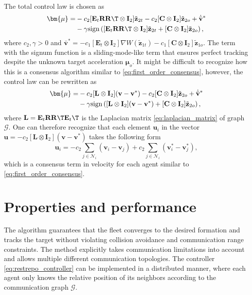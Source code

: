 The total control law is chosen as
\begin{equation}\label{eq:restrepo_controller}
    \begin{split}
        \bm{\mu} = &-c_2 [\mathbf{E}_t \mathbf{R}\mathbf{R}\T \otimes \mathbf{I}_2]\tilde{\mathbf{z}}_{2t} - c_2 [\mathbf{C}\otimes \mathbf{I}_2]\tilde{\mathbf{z}}_{2o} + \dot{\Bar{\mathbf{v}}}^*\\
        &- \gamma \mathrm{sign}\left([\mathbf{E}_t \mathbf{R}\mathbf{R}\T \otimes \mathbf{I}_2]\tilde{\mathbf{z}}_{2t} + [\mathbf{C}\otimes \mathbf{I}_2]\tilde{\mathbf{z}}_{2o}\right),
    \end{split}
\end{equation}
where $c_2, \gamma > 0$ and $\bar{\mathbf{v}}^* = -c_1 [\mathbf{E}_t \otimes \mathbf{I}_2]\nabla W(\tilde{\mathbf{z}}_{1t}) - c_1 [\mathbf{C} \otimes \mathbf{I}_2]\tilde{\mathbf{z}}_{1o}$. The term with the signum function is a sliding-mode-like term that ensures perfect tracking despite the unknown target acceleration $\bm{\mu}_o$. It might be difficult to recognize how this is a consensus algorithm similar to \eqref{eq:first_order_consensus}, however, the control law can be rewritten as 
\begin{equation}
    \begin{split}
        \bm{\mu} = &-c_2 [\mathbf{L} \otimes \mathbf{I}_2](\mathbf{v} - \mathbf{v}^*) - c_2 [\mathbf{C}\otimes \mathbf{I}_2]\tilde{\mathbf{z}}_{2o} + \dot{\Bar{\mathbf{v}}}^*\\
        &- \gamma \mathrm{sign}\left([\mathbf{L} \otimes \mathbf{I}_2](\mathbf{v} - \mathbf{v}^*) + [\mathbf{C}\otimes \mathbf{I}_2]\tilde{\mathbf{z}}_{2o}\right),
    \end{split}
\end{equation}
where $\mathbf{L} = \mathbf{E}_t \mathbf{R} \mathbf{R}\T \mathbf{E}_t\T$ is the Laplacian matrix \eqref{eq:laplacian_matrix} of graph $\mathcal{G}$. One can therefore recognize that each element $\mathbf{u}_i$ in the vector $\mathbf{u} =  -c_2[\mathbf{L} \otimes \mathbf{I}_2](\mathbf{v}-\mathbf{v}^*)$ takes the following form
\begin{equation}
    \mathbf{u}_i = -c_2\sum_{j\in \mathcal{N}_i} (\mathbf{v}_i - \mathbf{v}_j) + c_2\sum_{j\in \mathcal{N}_i} (\mathbf{v}_i^* - \mathbf{v}_j^*),
\end{equation}
which is a consensus term in velocity for each agent similar to \eqref{eq:first_order_consensus}.

\section{Properties and performance}
The algorithm guarantees that the fleet converges to the desired formation and tracks the target without violating collision avoidance and communication range constraints. The method explicitly takes communication limitations into account and allows multiple different communication topologies. The controller \eqref{eq:restrepo_controller} can be implemented in a distributed manner, where each agent only knows the relative position of its neighbors according to the communication graph $\mathcal{G}$.

